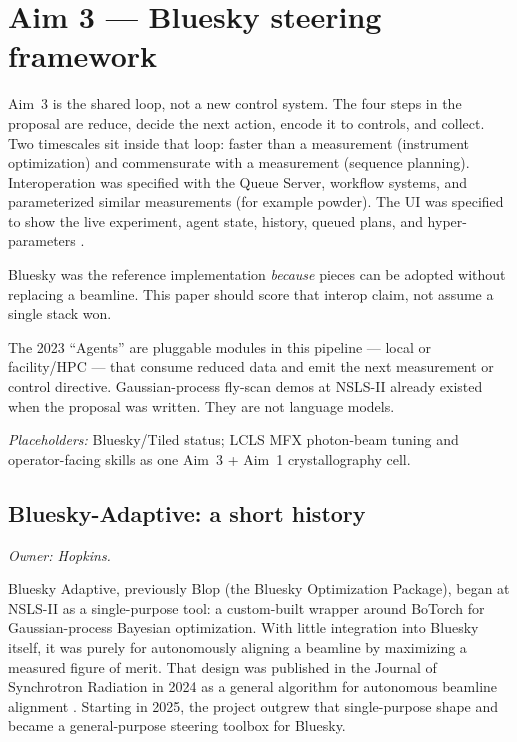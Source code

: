 \section{Aim 3 --- Bluesky steering framework}
\label{sec:aim3}

Aim~3 is the shared loop, not a new control system. The four steps in the
proposal are reduce, decide the next action, encode it to controls, and
collect. Two timescales sit inside that loop: faster than a measurement
(instrument optimization) and commensurate with a measurement (sequence
planning). Interoperation was specified with the Queue Server, workflow
systems, and parameterized similar measurements (for example powder). The UI
was specified to show the live experiment, agent state, history, queued plans,
and hyper-parameters \cite{allan2019bluesky}.

Bluesky was the reference implementation \emph{because} pieces can be adopted
without replacing a beamline. This paper should score that interop claim, not
assume a single stack won.

The 2023 ``Agents'' are pluggable modules in this pipeline --- local or
facility/HPC --- that consume reduced data and emit the next measurement or
control directive. Gaussian-process fly-scan demos at NSLS-II already existed
when the proposal was written. They are not language models.

\textit{Placeholders:} Bluesky/Tiled status; LCLS MFX photon-beam tuning and
operator-facing skills as one Aim~3 + Aim~1 crystallography cell.


\subsection{Bluesky-Adaptive: a short history}
\textit{Owner: Hopkins.}

Bluesky Adaptive, previously Blop (the Bluesky Optimization Package), began at NSLS-II
as a single-purpose tool: a custom-built wrapper around BoTorch for Gaussian-process 
Bayesian optimization. With little integration into Bluesky itself, it was purely
for autonomously aligning a beamline by maximizing a measured figure of merit. That 
design was published in the Journal of Synchrotron Radiation in 2024 as a general 
algorithm for autonomous beamline alignment \cite{Morris2024}. Starting in 2025, 
the project outgrew that single-purpose shape and became a general-purpose steering 
toolbox for Bluesky.

